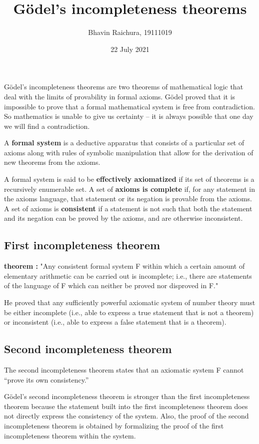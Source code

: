 \documentclass{article}
\title{Gödel's incompleteness theorems}
\author{Bhavin Raichura, 19111019}
\date{22 July 2021}
\begin{document}
\maketitle


Gödel's incompleteness theorems are two theorems of mathematical logic that deal with the limits of provability in formal axioms. Gödel proved that it is impossible to prove that a formal mathematical system is free from contradiction. So mathematics is unable to give us certainty – it is always possible that one day we will find a contradiction.

\item 
A \textbf{formal system} is a deductive apparatus that consists of a particular set of axioms along with rules of symbolic manipulation that allow for the derivation of new theorems from the axioms.

\item
A formal system is said to be \textbf{effectively axiomatized} if its set of theorems is a recursively enumerable set. A set of \textbf{axioms is complete} if, for any statement in the axioms language, that statement or its negation is provable from the axioms. A set of axioms is \textbf{consistent} if a statement is not such that both the statement and its negation can be proved by the axioms, and are otherwise inconsistent.

\subsection{First incompleteness theorem}
\item \textbf{theorem : }"Any consistent formal system F within which a certain amount of elementary arithmetic can be carried out is incomplete; i.e., there are statements of the language of F which can neither be proved nor disproved in F."
\item He proved that any sufficiently powerful axiomatic system of number theory must be either incomplete (i.e., able to express a true statement that is not a theorem) or inconsistent (i.e., able to express a false statement that is a theorem). 

\subsection{Second incompleteness theorem}
The second incompleteness theorem states that an axiomatic system F cannot “prove its own consistency.”

\item Gödel's second incompleteness theorem is stronger than the first incompleteness theorem because the statement built into the first incompleteness theorem does not directly express the consistency of the system. Also, the proof of the second incompleteness theorem is obtained by formalizing the proof of the first incompleteness theorem within the system.
\end{document}
